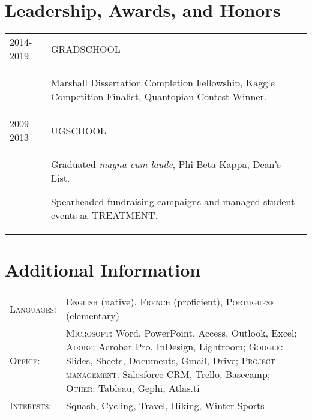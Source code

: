 \documentclass[a4paper,10pt]{article}
\begin{document}
\section{Leadership, Awards, and Honors}
\begin{supertabular}{p{3.4cm} p{13.9cm}}

	\textsc{2014-2019} 				& \textsc{GRADSCHOOL} \\
														& \begin{enumerate*}[label =$\diamond$, itemjoin={\newline}]
																\item \footnotesize Marshall Dissertation Completion Fellowship, Kaggle Competition Finalist, Quantopian Contest Winner.
																\end{enumerate*} \vspace{1mm} \\

	\textsc{2009-2013} 				& \textsc{UGSCHOOL} \\
														& \begin{enumerate*}[label =$\diamond$, itemjoin={\newline}]
																\item \footnotesize  Graduated \emph{magna cum laude}, Phi Beta Kappa, Dean's List.
																\item \footnotesize  Spearheaded fundraising campaigns and managed student events as TREATMENT.
																\end{enumerate*} \vspace{0mm} \\



\end{supertabular}



\section{Additional Information}
\begin{supertabular}{p{3.4cm} p{13.9cm}}
	\textsc{Languages:}			& \small\textsc{English} (native), \textsc{French} (proficient), \textsc{Portuguese} (elementary) \vspace{1mm} \\

	\textsc{Office:}					& \small\textsc{Microsoft}: \footnotesize Word, PowerPoint, Access, Outlook, Excel;	\small\textsc{Adobe}: \footnotesize Acrobat Pro, InDesign, Lightroom; \small\textsc{Google}: \footnotesize Slides, Sheets, Documents, Gmail, Drive; \small\textsc{Project management:} \footnotesize Salesforce CRM, Trello, Basecamp; \small\textsc{Other:} \footnotesize Tableau, Gephi, Atlas.ti \vspace{1mm} \\
	\textsc{Interests:} 		& \small Squash, Cycling, Travel, Hiking, Winter Sports \\

\end{supertabular}
\end{document}
